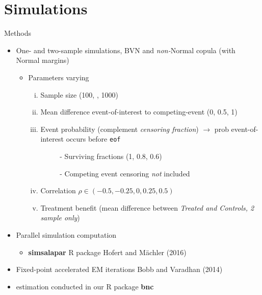 \hypertarget{results}{%
\section{Simulations}\label{simulations}}

\begin{frame}[fragile]{Methods}
\protect\hypertarget{methods}{}

\begin{itemize}
\tightlist
\item
  One- and two-sample simulations, BVN and \emph{non-}Normal copula
  (with Normal margins)

  \begin{itemize}
  \tightlist
  \item
    Parameters varying

    \begin{enumerate}
    [i.]
    \tightlist
    \item
      Sample size (100, {\color{red}{400}}, 1000)  {\color{red}{why not 500}}
    \item
      Mean difference event-of-interest to competing-event (0, 0.5, 1)
    \item
      Event probability (complement \emph{censoring fraction}) $\to$ prob event-of-interest occurs before \texttt{eof}
        \begin{itemize}
        \tightlist
        \item[~~-]
          Surviving fractions (1, 0.8, 0.6)
        \item[~~-]
          Competing event censoring \emph{not} included
        \end{itemize}
    \item
      \alert{Correlation} \(\rho \in (-0.5,-0.25, 0, 0.25, 0.5)\)
    \item
      \alert{Treatment benefit} (mean difference between \emph{Treated
      and Controls, 2 sample only})
    \end{enumerate} %
  \end{itemize}

\item
  Parallel simulation computation
  \begin{itemize}
  \tightlist
  \item
    \textbf{simsalapar} R package Hofert and Mächler (2016)
  \end{itemize}

\item
  Fixed-point accelerated EM iterations Bobb and Varadhan (2014)
\item
  estimation conducted in our R package \textbf{bnc}
\end{itemize}

\end{frame}